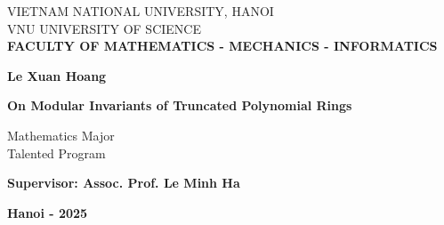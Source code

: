 \documentclass[12pt,a4paper]{report}
\theoremstyle{definition}
\theoremstyle{remark}
\theoremstyle{definition}
\begin{document}
	\begin{titlepage}
		\thisfancypage{
			\setlength{\fboxsep}{1pt}
			\setlength{\fboxrule}{1.2pt}
			\doublebox}{}
		\vspace*{-0.5cm}
		\begin{center}
			{\fontsize{13pt}{1}\selectfont  VIETNAM NATIONAL UNIVERSITY, HANOI} \\
			{\fontsize{13pt}{1}\selectfont  VNU UNIVERSITY OF SCIENCE} \\
			{\fontsize{13pt}{1}\selectfont  \bf FACULTY OF MATHEMATICS - MECHANICS - INFORMATICS}
			
		\end{center}
		\vspace*{2.5cm}
		\begin{center}
			{\bf\fontsize{14pt}{1}\selectfont Le Xuan Hoang}
		\end{center}
		\vspace*{2.5cm}
		\begin{center}
			{\bf\fontsize{18pt}{1}\selectfont On Modular Invariants of Truncated Polynomial Rings}
		\end{center}
		\vspace*{0.5cm}
		\begin{center}
			{\fontsize{14pt}{1}\selectfont Mathematics Major}\\
		{\fontsize{14pt}{1}\selectfont Talented Program}\\
		\end{center}
		\vspace*{0.5cm}
		\begin{center}
			{\bf\fontsize{14pt}{1}\selectfont Supervisor: Assoc. Prof. Le Minh Ha}
		\end{center}
		\vfill
		\begin{center}
			{\bf\fontsize{14pt}{1}\selectfont Hanoi - 2025}
		\end{center}
	\end{titlepage}
\vspace*{2cm}
\tableofcontents
\newpage
\end{document}
